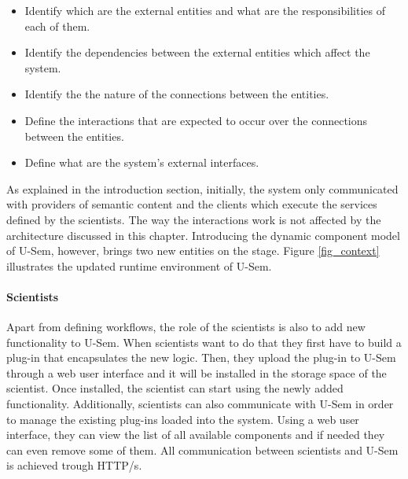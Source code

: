 \begin{itemize}
	\item Identify which are the external entities and what are the responsibilities of each of them.
	\item Identify the dependencies between the external entities which affect the system.
	\item Identify the the nature of the connections between the entities.
	\item Define the interactions that are expected to occur over the connections between the entities.
	\item Define what are the system's external interfaces.
\end{itemize}


As explained in the introduction section, initially, the system only communicated with providers of semantic content and the clients which execute the services defined by the scientists. The way the interactions work is not affected by the architecture discussed in this chapter. Introducing the dynamic component model of U-Sem, however, brings two new entities on the stage. Figure \ref{fig_context} illustrates the updated runtime environment of U-Sem.


\paragraph{Scientists}
Apart from defining workflows, the role of the scientists is also to add new functionality to U-Sem. When scientists want to do that they first have to build a plug-in that encapsulates the new logic. Then, they upload the plug-in to U-Sem through a web user interface and it will be installed in the storage space of the scientist. Once installed, the scientist can start using the newly added functionality. Additionally, scientists can also communicate with U-Sem in order to manage the existing plug-ins loaded into the system. Using a web user interface, they can view the list of all available components and if needed they can even remove some of them. All communication between scientists and U-Sem is achieved trough HTTP/s.


